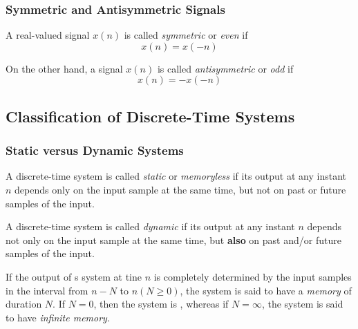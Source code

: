 \subsubsection{Symmetric and Antisymmetric Signals}\label{subsubsec:Symmetric and Antisymmetric Signals}
A real-valued signal $x(n)$ is called \emph{symmetric} or \emph{even} if
\begin{equation}\label{eq:Symmetric Signal}
  x(n) = x(-n)
\end{equation}

On the other hand, a signal $x(n)$ is called \emph{antisymmetric} or \emph{odd} if
\begin{equation}\label{eq:Asymmetric Signal}
  x(n) = -x(-n)
\end{equation}


\subsection{Classification of Discrete-Time Systems}\label{subsec:Classification_Discrete-Time_Systems}
\subsubsection{Static versus Dynamic Systems}\label{subsubsec:Static_vs_Dynamic_Systems}
\begin{definition}[Static]\label{def:Static}
  A discrete-time system is called \emph{static} or \emph{memoryless} if its output at any instant $n$ depends only on the input sample at the same time, but not on past or future samples of the input.
\end{definition}

\begin{definition}[Dynamic]\label{def:Dynamic}
  A discrete-time system is called \emph{dynamic} if its output at any instant $n$ depends not only on the input sample at the same time, but \textbf{also} on past and/or future samples of the input.

  If the output of s system at tine $n$ is completely determined by the input samples in the interval from $n-N$ to $n(N\geq 0)$, the system is said to have a \emph{memory} of duration $N$.
  If $N=0$, then the system is , whereas if $N=\infty$, the system is said to have \emph{infinite memory}.
\end{definition}

